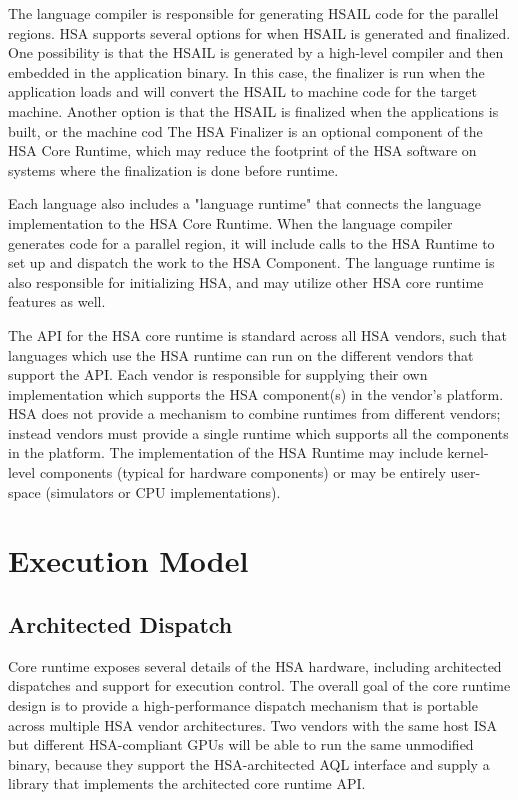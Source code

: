 \documentclass[draft]{book}
\begin{document}
The language compiler is responsible for generating HSAIL code for the parallel
regions. HSA supports several options for when HSAIL is generated and
finalized. One possibility is that the HSAIL is generated by a high-level
compiler and then embedded in the application binary. In this case, the
finalizer is run when the application loads and will convert the HSAIL to
machine code for the target machine. Another option is that the HSAIL is
finalized when the applications is built, or the machine cod The HSA Finalizer
is an optional component of the HSA Core Runtime, which may reduce the footprint
of the HSA software on systems where the finalization is done before runtime.

Each language also includes a "language runtime" that connects the language
implementation to the HSA Core Runtime. When the language compiler generates
code for a parallel region, it will include calls to the HSA Runtime to set up
and dispatch the work to the HSA Component. The language runtime is also
responsible for initializing HSA, and may utilize other HSA core runtime
features as well.

The API for the HSA core runtime is standard across all HSA vendors, such that
languages which use the HSA runtime can run on the different vendors that
support the API. Each vendor is responsible for supplying their own
implementation which supports the HSA component(s) in the vendor's platform. HSA
does not provide a mechanism to combine runtimes from different vendors; instead
vendors must provide a single runtime which supports all the components in the
platform. The implementation of the HSA Runtime may include kernel-level
components (typical for hardware components) or may be entirely user-space
(simulators or CPU implementations).

\hypertarget{executionmodel}{}\section{Execution
Model}\label{executionmodel}


\hypertarget{archdispatch}{}\subsection{Architected Dispatch}
\label{archdispatch}

Core runtime exposes several details of the HSA hardware, including architected
dispatches and support for execution control. The overall goal of the core
runtime design is to provide a high-\/performance dispatch mechanism that is
portable across multiple HSA vendor architectures. Two vendors with the same
host ISA but different HSA-\/compliant GPUs will be able to run the same
unmodified binary, because they support the HSA-\/architected AQL interface and
supply a library that implements the architected core runtime API.
\end{document}
